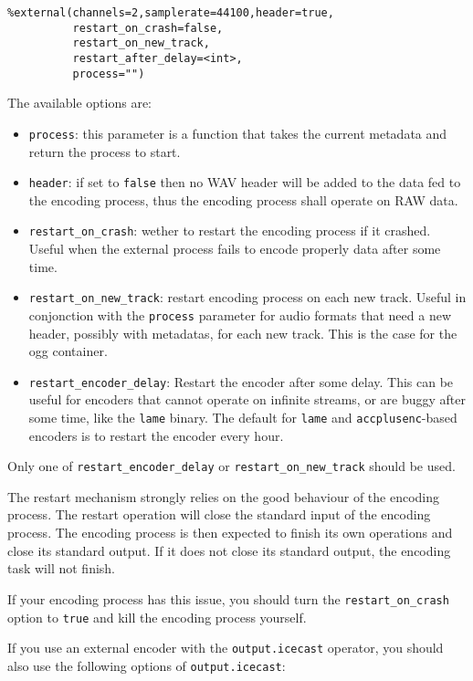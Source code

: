 \documentclass{book}
\begin{document}
\begin{verbatim}
%external(channels=2,samplerate=44100,header=true,
          restart_on_crash=false,
          restart_on_new_track,
          restart_after_delay=<int>,
          process="")
\end{verbatim}
The available options are:

\begin{itemize}
\item \verb+process+: this parameter is a function that takes the current metadata and return the process to start.
\item \verb+header+: if set to \verb+false+ then no WAV header will be added to the data fed to the encoding process, thus the encoding process shall operate on RAW data.
\item \verb+restart_on_crash+: wether to restart the encoding process if it crashed. Useful when the external process fails to encode properly data after some time.
\item \verb+restart_on_new_track+: restart encoding process on each new track. Useful in conjonction with the \verb+process+ parameter for audio formats that need a new header, possibly with metadatas, for each new track. This is the case for the ogg container.
\item \verb+restart_encoder_delay+: Restart the encoder after some delay. This can be useful for encoders that cannot operate on infinite streams, or are buggy after some time, like the \verb+lame+ binary. The default for \verb+lame+ and \verb+accplusenc+-based encoders is to restart the encoder every hour.

\end{itemize}
Only one of \verb+restart_encoder_delay+ or \verb+restart_on_new_track+ should be used.

The restart mechanism strongly relies on the good behaviour of the encoding process. The restart operation will 
close the standard input of the encoding process. The encoding process is then expected to finish its own operations and
close its standard output. If it does not close its standard output, the encoding task will not finish. 

If your encoding process has this issue, you should turn the \verb+restart_on_crash+ option to \verb+true+ and kill the encoding
process yourself.

If you use an external encoder with the \verb+output.icecast+ operator,
you should also use the following options of \verb+output.icecast+:
\end{document}
